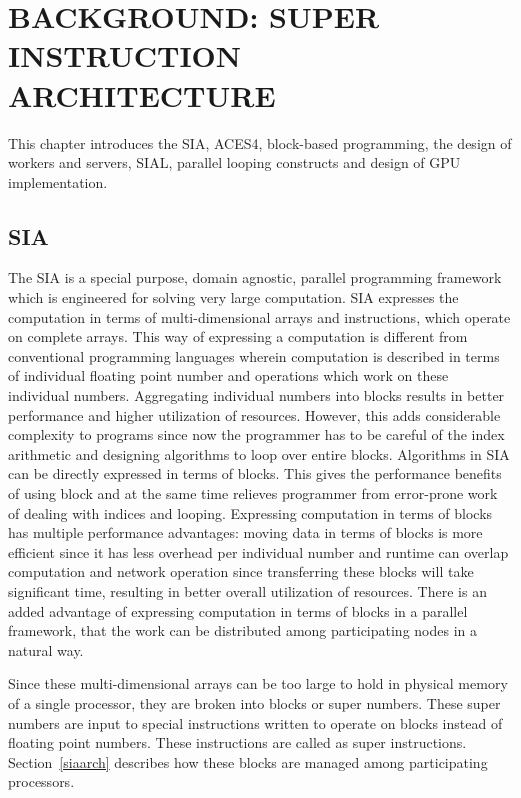 \chapter{BACKGROUND: SUPER INSTRUCTION ARCHITECTURE} \label{background}

This chapter introduces the SIA, ACES4, block-based
programming, the design of workers and servers, SIAL, parallel looping constructs
and design of GPU implementation.

\section{SIA}
The SIA is a special purpose, domain agnostic,
parallel programming framework which is engineered for solving very large
computation. SIA expresses the computation in terms of multi-dimensional arrays and
instructions, which operate on complete arrays. This way of expressing a computation
is different from conventional programming
languages wherein computation is described in terms of individual floating point
number and operations which work on these individual numbers. Aggregating
individual numbers into blocks results in better performance and higher utilization
of resources. However, this adds considerable complexity to programs since now
the programmer has to be careful of the index arithmetic and designing algorithms to loop
over entire blocks. Algorithms in SIA can be directly expressed in terms of
blocks. This gives the performance benefits of using block and at the same time relieves
programmer from error-prone work of dealing with indices and looping. Expressing
computation in terms of blocks has multiple performance advantages: moving data in terms
of blocks is more efficient since it has less overhead per individual number
and runtime can overlap computation and network operation since transferring these
blocks will take significant time, resulting in better overall utilization of resources.
There is an added advantage of expressing computation in terms of blocks in a parallel
framework, that the work can be distributed among participating nodes in a natural
way.

Since these multi-dimensional arrays can be too
large to hold in physical memory of a single processor, they are broken into
blocks or super numbers. These super numbers are input to special instructions
written to operate on blocks instead of floating point numbers. These
instructions are called as super instructions. Section~\ref{siaarch} describes how
these blocks are managed among participating processors.

